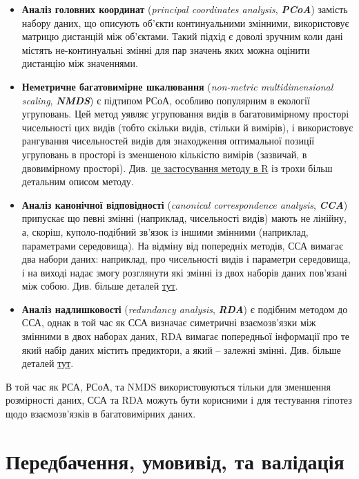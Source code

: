 \documentclass[
  11pt,
]{book}
\begin{document}
\begin{itemize}
\item
  \textbf{Аналіз головних координат} (\emph{principal coordinates analysis}, \textbf{\emph{PCoA}}) замість набору даних, що описують об'єкти континуальними змінними, використовує матрицю дистанцій між об'єктами. Такий підхід є доволі зручним коли дані містять не-континуальні змінні для пар значень яких можна оцінити дистанцію між значеннями.
\item
  \textbf{Неметричне багатовимірне шкалювання} (\emph{non-metric multidimensional scaling}, \textbf{\emph{NMDS}}) є підтипом РСоА, особливо популярним в екології угруповань. Цей метод уявляє угруповання видів в багатовимірному просторі чисельності цих видів (тобто скільки видів, стільки й вимірів), і використовує рангування чисельностей видів для знаходження оптимальної позиції угруповань в просторі із зменшеною кількістю вимірів (зазвичай, в двовимірному просторі). Див. \href{https://jonlefcheck.net/2012/10/24/nmds-tutorial-in-r/}{це застосування методу в R} із трохи більш детальним описом методу.
\item
  \textbf{Аналіз канонічної відповідності} (\emph{canonical correspondence analysis}, \textbf{\emph{CCA}}) припускає що певні змінні (наприклад, чисельності видів) мають не лінійну, а, скоріш, куполо-подібний зв'язок із іншими змінними (наприклад, параметрами середовища). На відміну від попередніх методів, ССА вимагає два набори даних: наприклад, про чисельності видів і параметри середовища, і на виході надає змогу розглянути які змінні із двох наборів даних пов'язані між собою. Див. більше деталей \href{https://rfunctions.blogspot.com/2016/11/canonical-correspondence-analysis-cca.html}{тут}.
\item
  \textbf{Аналіз надлишковості} (\emph{redundancy analysis}, \textbf{\emph{RDA}}) є подібним методом до ССА, однак в той час як ССА визначає симетричні взаємозв'язки між змінними в двох наборах даних, RDA вимагає попередньої інформації про те який набір даних містить предиктори, а який -- залежні змінні. Див. більше деталей \href{https://r.qcbs.ca/workshop10/book-en/redundancy-analysis.html}{тут}.
\end{itemize}

В той час як РСА, РСоА, та NMDS використовуються тільки для зменшення розмірності даних, ССА та RDA можуть бути корисними і для тестування гіпотез щодо взаємозв'язків в багатовимірних даних.

\section{Передбачення, умовивід, та валідація}\label{infer}
\end{document}
